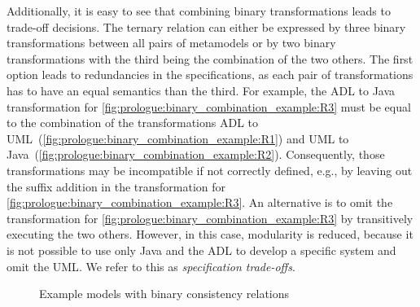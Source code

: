 Additionally, it is easy to see that %
combining binary transformations leads to trade-off decisions.
The ternary relation %
can either be expressed by three binary transformations between all pairs of metamodels or by two binary transformations with the third being %
the combination of the two others.
The first option leads to redundancies in the specifications, as each pair of transformations has to have an equal semantics than the third.
For example, the \ac{ADL} to Java transformation for \ref{fig:prologue:binary_combination_example:R3} must be equal to the combination of the transformations \ac{ADL} to \ac{UML}~(\ref{fig:prologue:binary_combination_example:R1}) and \ac{UML} to Java~(\ref{fig:prologue:binary_combination_example:R2}).
Consequently, those transformations may be incompatible if not correctly defined, e.g., by leaving out the suffix addition in the transformation for \ref{fig:prologue:binary_combination_example:R3}.
An alternative is to omit the transformation for \ref{fig:prologue:binary_combination_example:R3} by transitively executing the two others.
However, in this case, modularity is reduced, because it is not possible to use only Java and the \ac{ADL} to develop a specific system and omit the \ac{UML}.
We refer to this as \emph{specification trade-offs}.

\begin{figure}
    \centering
    
    \caption{Example models with binary consistency relations}
    \label{fig:prologue:binary_combination_example}
\end{figure}


